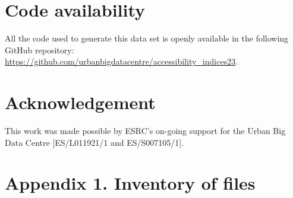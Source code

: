 \documentclass{article}
\begin{document}
\pagebreak

\hypertarget{code-availability}{%
\section*{Code availability}\label{code-availability}}

All the code used to generate this data set is openly available in the
following GitHub repository:
\url{https://github.com/urbanbigdatacentre/accessibility_indices23}.

\hypertarget{acknowledgement}{%
\section*{Acknowledgement}\label{acknowledgement}}

This work was made possible by ESRC's on-going support for the Urban Big
Data Centre {[}ES/L011921/1 and ES/S007105/1{]}.

\hypertarget{inventory}{%
\section{Appendix 1. Inventory of files}\label{inventory}}

\begingroup\fontsize{8}{10}\selectfont
\end{document}
